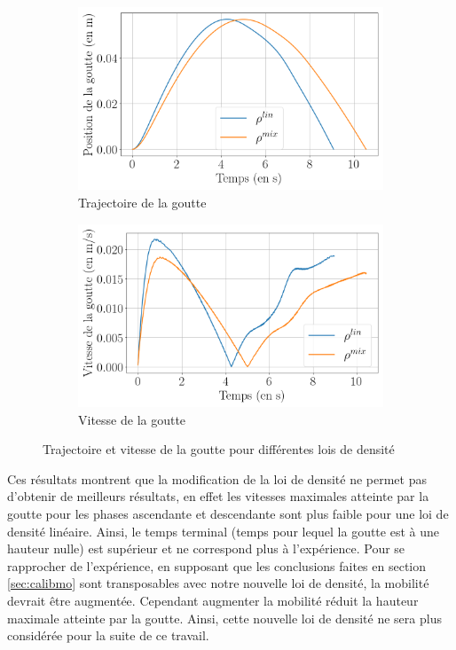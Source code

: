 \begin{figure}[H] 
	\centering
	\begin{subfigure}[H]{0.47\textwidth}
		\centering
		\includegraphics[width=\textwidth]{figure/influence_DensityLaw_position.png}
		\caption{Trajectoire de la goutte}

	\end{subfigure} 
	\begin{subfigure}[H]{0.47\textwidth}
		\centering
		\includegraphics[width=\textwidth]{figure/influence_DensityLaw_vitesse.png}
		\caption{Vitesse de la goutte}
	\end{subfigure}
	\caption{Trajectoire et vitesse de la goutte pour différentes lois de densité}
	\label{fig:resultat_rhomix}
\end{figure}
Ces résultats montrent que la modification de la loi de densité ne permet pas d'obtenir de meilleurs résultats, en effet les vitesses maximales atteinte par la goutte pour les phases ascendante et descendante sont plus faible pour une loi de densité linéaire. Ainsi, le temps terminal (temps pour lequel la goutte est à une hauteur nulle) est supérieur et ne correspond plus à l'expérience. Pour se rapprocher de l'expérience, en supposant que les conclusions faites en section \ref{sec:calibmo} sont transposables avec notre nouvelle loi de densité, la mobilité devrait être augmentée. Cependant augmenter la mobilité réduit la hauteur maximale atteinte par la goutte. Ainsi, cette nouvelle loi de densité ne sera plus considérée pour la suite de ce travail.



